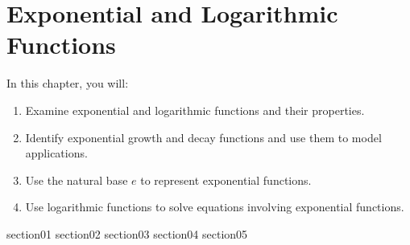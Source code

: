 \chapter{Exponential and Logarithmic Functions}

In this chapter, you will:
\begin{enumerate}
    \item Examine exponential and logarithmic functions and their properties.
    \item Identify exponential growth and decay functions and use them to model applications.
    \item Use the natural base \( e \) to represent exponential functions.
    \item Use logarithmic functions to solve equations involving exponential functions.
\end{enumerate}


{section01}
{section02}
{section03}
{section04}
{section05}